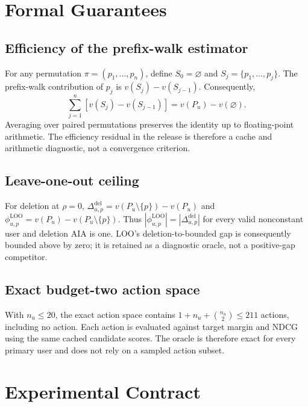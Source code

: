 \documentclass[pdflatex,sn-mathphys-num]{sn-jnl}
\begin{document}
\section{Formal Guarantees}\label{app:proofs}

\subsection{Efficiency of the prefix-walk estimator}
For any permutation $\pi=(p_1,\ldots,p_n)$, define $S_0=\varnothing$ and $S_j=\{p_1,\ldots,p_j\}$. The prefix-walk contribution of $p_j$ is $v(S_j)-v(S_{j-1})$. Consequently,
\begin{equation}
\sum_{j=1}^{n}\left[v(S_j)-v(S_{j-1})\right]=v(P_u)-v(\varnothing).
\end{equation}
Averaging over paired permutations preserves the identity up to floating-point arithmetic. The efficiency residual in the release is therefore a cache and arithmetic diagnostic, not a convergence criterion.

\subsection{Leave-one-out ceiling}
For deletion at $\rho=0$, $\Delta^{\mathrm{del}}_{u,p}=v(P_u\setminus\{p\})-v(P_u)$ and $\phi^{\mathrm{LOO}}_{u,p}=v(P_u)-v(P_u\setminus\{p\})$. Thus $|\phi^{\mathrm{LOO}}_{u,p}|=|\Delta^{\mathrm{del}}_{u,p}|$ for every valid nonconstant user and deletion AIA is one. LOO's deletion-to-bounded gap is consequently bounded above by zero; it is retained as a diagnostic oracle, not a positive-gap competitor.

\subsection{Exact budget-two action space}
With $n_u\le20$, the exact action space contains $1+n_u+\binom{n_u}{2}\le211$ actions, including no action. Each action is evaluated against target margin and NDCG using the same cached candidate scores. The oracle is therefore exact for every primary user and does not rely on a sampled action subset.

\FloatBarrier
\clearpage
\section{Experimental Contract}\label{app:contract}
\setcounter{table}{0}
\end{document}
